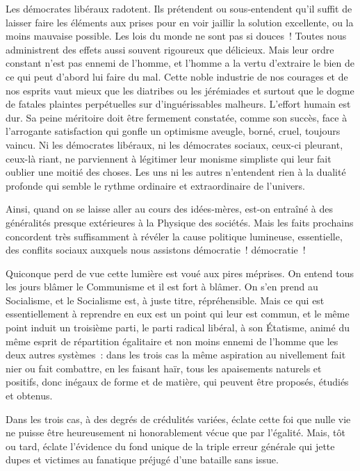 \documentclass[french,twoside]{book} %
\begin{document}
Les démocrates libéraux radotent. Ils prétendent ou sous-entendent qu’il suffit de laisser faire les éléments aux prises pour en voir jaillir la solution excellente, ou la moins mauvaise possible. Les lois du monde ne sont pas si douces ! Toutes nous administrent des effets aussi souvent rigoureux que délicieux. Mais leur ordre constant n’est pas ennemi de l’homme, et l’homme a la vertu d’extraire le bien de ce qui peut d’abord lui faire du mal. Cette noble industrie de nos courages et de nos esprits vaut mieux que les diatribes ou les jérémiades et surtout que le dogme de fatales plaintes perpétuelles sur d’inguérissables malheurs. L’effort humain est dur. Sa peine méritoire doit être fermement constatée, comme son succès, face à l’arrogante satisfaction qui gonfle un optimisme aveugle, borné, cruel, toujours vaincu. Ni les démocrates libéraux, ni les démocrates sociaux, ceux-ci pleurant, ceux-là riant, ne parviennent à légitimer leur monisme simpliste qui leur fait oublier une moitié des choses. Les uns ni les autres n’entendent rien à la dualité profonde qui semble le rythme ordinaire et extraordinaire de l’univers.\par
Ainsi, quand on se laisse aller au cours des idées-mères, est-on entraîné à des généralités presque extérieures à la Physique des sociétés. Mais les faits prochains concordent très suffisamment à révéler la cause politique lumineuse, essentielle, des conflits sociaux auxquels nous assistons démocratie ! démocratie !\par
Quiconque perd de vue cette lumière est voué aux pires méprises. On entend tous les jours blâmer le Communisme et il est fort à blâmer. On s’en prend au Socialisme, et le Socialisme est, à juste titre, répréhensible. Mais ce qui est essentiellement à reprendre en eux est un point qui leur est commun, et le même point induit un troisième parti, le parti radical libéral, à son Étatisme, animé du même esprit de répartition égalitaire et non moins ennemi de l’homme que les deux autres systèmes : dans les trois cas la même aspiration au nivellement fait nier ou fait combattre, en les faisant haïr, tous les apaisements naturels et positifs, donc inégaux de forme et de matière, qui peuvent être proposés, étudiés et obtenus.\par
Dans les trois cas, à des degrés de crédulités variées, éclate cette foi que nulle vie ne puisse être heureusement ni honorablement vécue que par l’égalité. Mais, tôt ou tard, éclate l’évidence du fond unique de la triple erreur générale qui jette dupes et victimes au fanatique préjugé d’une bataille sans issue.\par
\end{document}
